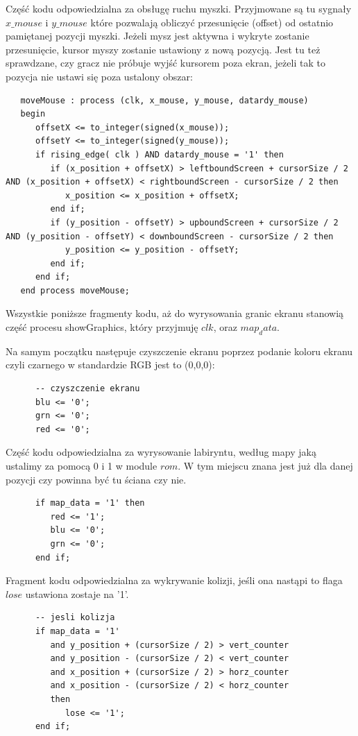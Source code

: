 \documentclass[a4paper]{article}
\begin{document}
Część kodu odpowiedzialna za obsługę ruchu myszki. Przyjmowane są tu sygnały $x\_mouse$ i $y\_mouse$ które pozwalają obliczyć przesunięcie (offset) od ostatnio pamiętanej pozycji myszki. Jeżeli mysz jest aktywna i wykryte zostanie przesunięcie, kursor myszy zostanie ustawiony z nową pozycją. Jest tu też sprawdzane, czy gracz nie próbuje wyjść kursorem poza ekran, jeżeli tak to pozycja nie ustawi się poza ustalony obszar:
\begin{verbatim}
   moveMouse : process (clk, x_mouse, y_mouse, datardy_mouse)
   begin
      offsetX <= to_integer(signed(x_mouse));
      offsetY <= to_integer(signed(y_mouse));
      if rising_edge( clk ) AND datardy_mouse = '1' then 
         if (x_position + offsetX) > leftboundScreen + cursorSize / 2 AND (x_position + offsetX) < rightboundScreen - cursorSize / 2 then 
            x_position <= x_position + offsetX;
         end if;
         if (y_position - offsetY) > upboundScreen + cursorSize / 2 AND (y_position - offsetY) < downboundScreen - cursorSize / 2 then 
            y_position <= y_position - offsetY;
         end if;
      end if;
   end process moveMouse; 
\end{verbatim}

Wszystkie poniższe fragmenty kodu, aż do wyrysowania granic ekranu stanowią część procesu showGraphics, który przyjmuję $clk$, oraz $map_data$.

Na samym początku następuje czyszczenie ekranu poprzez podanie koloru ekranu czyli czarnego w standardzie RGB jest to (0,0,0):
\begin{verbatim}
      -- czyszczenie ekranu
      blu <= '0';
      grn <= '0';
      red <= '0';
  \end{verbatim}

Część kodu odpowiedzialna za wyrysowanie labiryntu, według mapy jaką ustalimy za pomocą 0 i 1 w module $rom$. W tym miejscu znana jest już dla danej pozycji czy powinna być tu ściana czy nie.
\begin{verbatim}
      if map_data = '1' then
         red <= '1';
         blu <= '0';
         grn <= '0';
 	  end if; 
\end{verbatim}

Fragment kodu odpowiedzialna za wykrywanie kolizji, jeśli ona nastąpi to flaga $lose$ ustawiona zostaje na '1'.
\begin{verbatim}
      -- jesli kolizja
      if map_data = '1' 
         and y_position + (cursorSize / 2) > vert_counter 
         and y_position - (cursorSize / 2) < vert_counter        
         and x_position + (cursorSize / 2) > horz_counter             
         and x_position - (cursorSize / 2) < horz_counter 
         then  
            lose <= '1';
      end if; 
\end{verbatim}
\end{document}
